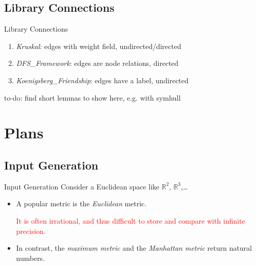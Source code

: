 \documentclass[%
	sans,
	12pt,
]{beamer}
\newcommand{\bad}[1]{\textcolor{red}{#1}}
\newcommand{\RR}{\mathbb{R}}
\begin{document}
\subsection{Library Connections}
\begin{frame}{Library Connections}
\begin{enumerate}
	\item \textit{Kruskal}: edges with weight field, undirected/directed
	\item \textit{DFS\_Framework}: edges are node relations, directed
	\item \textit{Koenigsberg\_Friendship}: edges have a label, undirected
\end{enumerate}
to-do: find short lemmas to show here, e.g. with symhull
\end{frame}

\section{Plans}
\subsection{Input Generation}%
\begin{frame}{Input Generation}
Consider a Euclidean space like $\RR^2$, $\RR^3$,\dots
	\begin{itemize}
		\item A popular metric is the \textit{Euclidean} metric.\pause
		
		\bad{It is often irrational, and thus difficult to store and compare with infinite precision.}\pause
		\item In contrast, the \textit{maximum metric} and the \textit{Manhattan metric} return natural numbers. %
	\end{itemize}
\end{frame}
\end{document}

